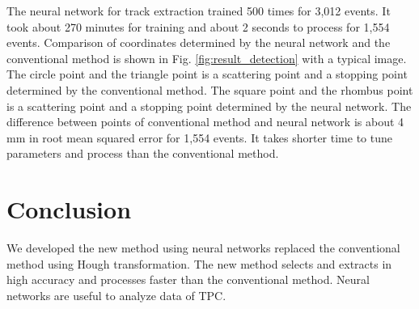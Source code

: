 \documentclass{jps-cp}
\begin{document}
The neural network for track extraction trained 500 times for 3,012 events.
It took about 270 minutes for training and about 2 seconds to process for 1,554 events.
Comparison of coordinates determined by the neural network and the conventional method is shown in Fig. \ref{fig:result_detection}
with a typical image.
The circle point and the triangle point is a scattering point and a stopping point determined by the conventional method.
The square point and the rhombus point is a scattering point and a stopping point determined by the neural network.
The difference between points of conventional method and neural network is about 4 mm in root mean squared error for 1,554 events.
It takes shorter time to tune parameters and process than the conventional method.


\section{Conclusion}
We developed the new method using neural networks replaced the conventional method using Hough transformation.
The new method selects and extracts in high accuracy and processes faster than the conventional method.
Neural networks are useful to analyze data of TPC.
\end{document}

